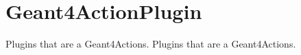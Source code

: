 \hypertarget{group___geant4_action_plugin}{
\section{Geant4ActionPlugin}
\label{group___geant4_action_plugin}
}


Plugins that are a Geant4Actions.  
Plugins that are a Geant4Actions. 